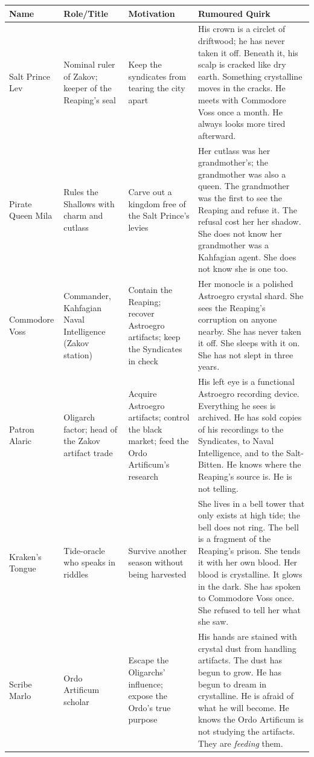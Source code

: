 \begin{longtable}{|p{}|p{}|p{}|p{}|}
\hline
\textbf{Name} & \textbf{Role/Title} & \textbf{Motivation} & \textbf{Rumoured Quirk} \\
\hline
Salt Prince Lev & Nominal ruler of Zakov; keeper of the Reaping's seal & Keep the syndicates from tearing the city apart & His crown is a circlet of driftwood; he has never taken it off. Beneath it, his scalp is cracked like dry earth. Something crystalline moves in the cracks. He meets with Commodore Voss once a month. He always looks more tired afterward. \\
\hline
Pirate Queen Mila & Rules the Shallows with charm and cutlass & Carve out a kingdom free of the Salt Prince's levies & Her cutlass was her grandmother's; the grandmother was also a queen. The grandmother was the first to see the Reaping and refuse it. The refusal cost her her shadow. She does not know her grandmother was a Kahfagian agent. She does not know she is one too. \\
\hline
Commodore Voss & Commander, Kahfagian Naval Intelligence (Zakov station) & Contain the Reaping; recover Astroegro artifacts; keep the Syndicates in check & Her monocle is a polished Astroegro crystal shard. She sees the Reaping's corruption on anyone nearby. She has never taken it off. She sleeps with it on. She has not slept in three years. \\
\hline
Patron Alaric & Oligarch factor; head of the Zakov artifact trade & Acquire Astroegro artifacts; control the black market; feed the Ordo Artificum's research & His left eye is a functional Astroegro recording device. Everything he sees is archived. He has sold copies of his recordings to the Syndicates, to Naval Intelligence, and to the Salt-Bitten. He knows where the Reaping's source is. He is not telling. \\
\hline
Kraken's Tongue & Tide-oracle who speaks in riddles & Survive another season without being harvested & She lives in a bell tower that only exists at high tide; the bell does not ring. The bell is a fragment of the Reaping's prison. She tends it with her own blood. Her blood is crystalline. It glows in the dark. She has spoken to Commodore Voss once. She refused to tell her what she saw. \\
\hline
Scribe Marlo & Ordo Artificum scholar & Escape the Oligarchs' influence; expose the Ordo's true purpose & His hands are stained with crystal dust from handling artifacts. The dust has begun to grow. He has begun to dream in crystalline. He is afraid of what he will become. He knows the Ordo Artificum is not studying the artifacts. They are \textit{feeding} them. \\

\end{longtable}
